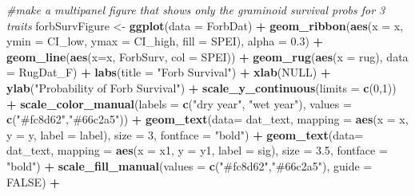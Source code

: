 \documentclass[
]{article}
\newenvironment{Shaded}{\begin{snugshade}}{\end{snugshade}}
\newcommand{\CommentTok}[1]{\textcolor[rgb]{0.56,0.35,0.01}{\textit{#1}}}
\newcommand{\DataTypeTok}[1]{\textcolor[rgb]{0.13,0.29,0.53}{#1}}
\newcommand{\DecValTok}[1]{\textcolor[rgb]{0.00,0.00,0.81}{#1}}
\newcommand{\FloatTok}[1]{\textcolor[rgb]{0.00,0.00,0.81}{#1}}
\newcommand{\KeywordTok}[1]{\textcolor[rgb]{0.13,0.29,0.53}{\textbf{#1}}}
\newcommand{\NormalTok}[1]{#1}
\newcommand{\OperatorTok}[1]{\textcolor[rgb]{0.81,0.36,0.00}{\textbf{#1}}}
\newcommand{\OtherTok}[1]{\textcolor[rgb]{0.56,0.35,0.01}{#1}}
\newcommand{\StringTok}[1]{\textcolor[rgb]{0.31,0.60,0.02}{#1}}
\begin{document}
\begin{Shaded}
\begin{Highlighting}[]
\CommentTok{\#make a multipanel figure that shows only the graminoid survival probs for 3 traits}
\NormalTok{forbSurvFigure \textless{}{-}}\StringTok{ }\KeywordTok{ggplot}\NormalTok{(}\DataTypeTok{data =}\NormalTok{ ForbDat) }\OperatorTok{+}
\StringTok{  }\KeywordTok{geom\_ribbon}\NormalTok{(}\KeywordTok{aes}\NormalTok{(}\DataTypeTok{x =}\NormalTok{ x, }\DataTypeTok{ymin =}\NormalTok{ CI\_low, }\DataTypeTok{ymax =}\NormalTok{ CI\_high, }\DataTypeTok{fill =}\NormalTok{ SPEI), }\DataTypeTok{alpha =} \FloatTok{0.3}\NormalTok{) }\OperatorTok{+}
\StringTok{  }\KeywordTok{geom\_line}\NormalTok{(}\KeywordTok{aes}\NormalTok{(}\DataTypeTok{x=}\NormalTok{x, ForbSurv, }\DataTypeTok{col =}\NormalTok{ SPEI))  }\OperatorTok{+}\StringTok{ }
\StringTok{  }\KeywordTok{geom\_rug}\NormalTok{(}\KeywordTok{aes}\NormalTok{(}\DataTypeTok{x =}\NormalTok{ rug), }\DataTypeTok{data =}\NormalTok{ RugDat\_F) }\OperatorTok{+}
\StringTok{  }\KeywordTok{labs}\NormalTok{(}\DataTypeTok{title =} \StringTok{"Forb Survival"}\NormalTok{) }\OperatorTok{+}
\StringTok{  }\KeywordTok{xlab}\NormalTok{(}\OtherTok{NULL}\NormalTok{) }\OperatorTok{+}
\StringTok{  }\KeywordTok{ylab}\NormalTok{(}\StringTok{"Probability of Forb Survival"}\NormalTok{) }\OperatorTok{+}
\StringTok{  }\KeywordTok{scale\_y\_continuous}\NormalTok{(}\DataTypeTok{limits =} \KeywordTok{c}\NormalTok{(}\DecValTok{0}\NormalTok{,}\DecValTok{1}\NormalTok{)) }\OperatorTok{+}
\StringTok{  }\KeywordTok{scale\_color\_manual}\NormalTok{(}\DataTypeTok{labels =} \KeywordTok{c}\NormalTok{(}\StringTok{"dry year"}\NormalTok{, }\StringTok{"wet year"}\NormalTok{), }\DataTypeTok{values =} \KeywordTok{c}\NormalTok{(}\StringTok{"\#fc8d62"}\NormalTok{,}\StringTok{"\#66c2a5"}\NormalTok{)) }\OperatorTok{+}
\StringTok{  }\KeywordTok{geom\_text}\NormalTok{(}\DataTypeTok{data=}\NormalTok{ dat\_text, }\DataTypeTok{mapping =} \KeywordTok{aes}\NormalTok{(}\DataTypeTok{x =}\NormalTok{ x, }\DataTypeTok{y =}\NormalTok{ y, }\DataTypeTok{label =}\NormalTok{ label), }\DataTypeTok{size =} \DecValTok{3}\NormalTok{, }\DataTypeTok{fontface =} \StringTok{"bold"}\NormalTok{) }\OperatorTok{+}
\StringTok{  }\KeywordTok{geom\_text}\NormalTok{(}\DataTypeTok{data=}\NormalTok{ dat\_text, }\DataTypeTok{mapping =} \KeywordTok{aes}\NormalTok{(}\DataTypeTok{x =}\NormalTok{ x1, }\DataTypeTok{y =}\NormalTok{ y1, }\DataTypeTok{label =}\NormalTok{ sig), }\DataTypeTok{size =} \FloatTok{3.5}\NormalTok{, }\DataTypeTok{fontface =} \StringTok{"bold"}\NormalTok{) }\OperatorTok{+}
\StringTok{  }\KeywordTok{scale\_fill\_manual}\NormalTok{(}\DataTypeTok{values =} \KeywordTok{c}\NormalTok{(}\StringTok{"\#fc8d62"}\NormalTok{,}\StringTok{"\#66c2a5"}\NormalTok{), }\DataTypeTok{guide =} \OtherTok{FALSE}\NormalTok{) }\OperatorTok{+}

\end{Highlighting}
\end{Shaded}
\end{document}

